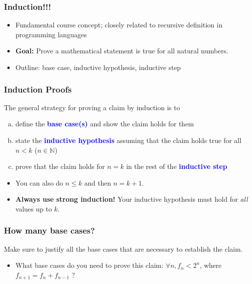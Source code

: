 \documentclass{beamer}
\begin{document}
\begin{frame}
  \frametitle{Induction!!!}
  \begin{itemize}[<+->]
    \item Fundamental course concept; closely related to recursive definition in programming languages
    \item \textbf{Goal: }Prove a mathematical statement is true for all natural numbers.
    \item Outline: base case, inductive hypothesis, inductive step
    
  \end{itemize}
\end{frame}

\begin{frame}[t]
  \frametitle{Induction Proofs}
  The general strategy for proving a claim by induction is to 
  \begin{enumerate}[(a)]
      \item define the \textcolor{blue}{\textbf{base case(s)}} and show the claim holds for them
      \item state the \textcolor{blue}{\textbf{inductive hypothesis}} assuming that the claim holds true for all $n < k$ ($n \in \mathbb{N}$)
      \item prove that the claim holds for $n = k$ in the rest of the \textcolor{blue}{\textbf{inductive step}}
  \end{enumerate}
  \begin{itemize}[<+->]
    \pause 
    \item You can also do $n \leq k$ and then $n = k+1$.
    \item \textbf{Always use strong induction!} Your inductive hypothesis must hold for \textit{all} values up to $k$.
  \end{itemize}
  
\end{frame}

\begin{frame}
  \frametitle{How many base cases?}
  Make sure to justify all the base cases that are necessary to establish the claim. 
  \begin{itemize}[<+->]
    \pause
      \item What base cases do you need to prove this claim: $\forall n, f_n < 2^n$, where $f_{n+1} = f_n + f_{n-1}$ ?

    \end{itemize}
    
\end{frame}
\end{document}
